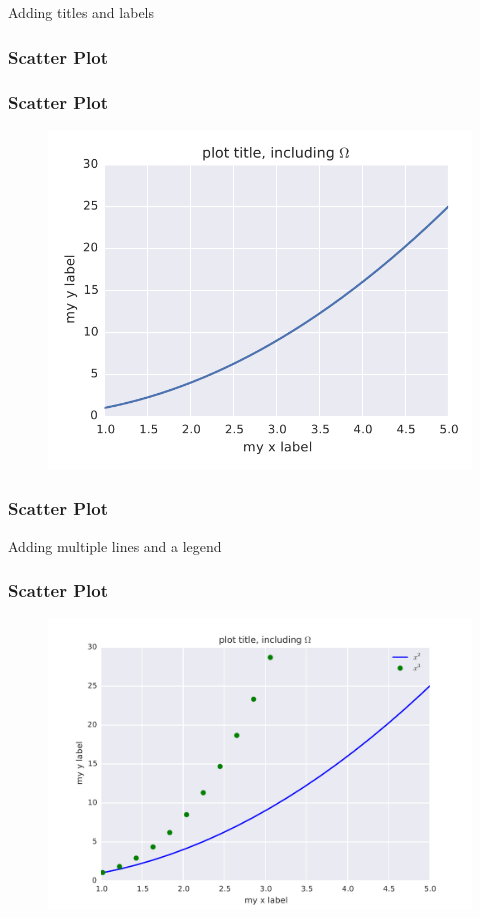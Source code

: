 \begin{frame}
Adding titles and labels
\frametitle{Scatter Plot}
\end{frame}

\begin{frame}
\frametitle{Scatter Plot}
\begin{figure}[h]
\centering
\includegraphics[width=.9\textwidth]{img/line_plot_plus.pdf}
\end{figure}
\end{frame}

\begin{frame}
\frametitle{Scatter Plot}
Adding multiple lines and a legend
\lstset{basicstyle=\small}
\end{frame}

\begin{frame}
\frametitle{Scatter Plot}
\begin{figure}[h]
\centering
\includegraphics[width=.9\textwidth]{img/line_plot_plus2.pdf}
\end{figure}
\end{frame}


